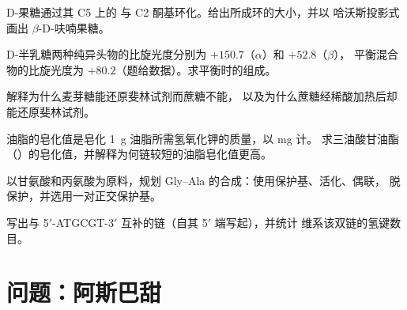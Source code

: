 \begin{exercise}[$\star\star$]\label{exo:b2:biomolecules:7}
D-果糖通过其 C5 上的  与 C2 酮基环化。给出所成环的大小，并以
哈沃斯投影式画出 $\beta$-D-呋喃果糖。
\end{exercise}

\begin{exercise}[$\star\star$]\label{exo:b2:biomolecules:8}
D-半乳糖两种纯异头物的比旋光度分别为 $+150.7$（$\alpha$）和 $+52.8$（$\beta$），
平衡混合物的比旋光度为 $+80.2$（题给数据）。求平衡时的组成。
\end{exercise}

\begin{exercise}[$\star\star$]\label{exo:b2:biomolecules:9}
解释为什么麦芽糖能还原斐林试剂而蔗糖不能，
以及为什么蔗糖经稀酸加热后却能还原斐林试剂。
\end{exercise}

\begin{exercise}[$\star\star\star$]\label{exo:b2:biomolecules:10}
油脂的皂化值是皂化 1~g 油脂所需氢氧化钾的质量，以 mg 计。
求三油酸甘油酯（）的皂化值，并解释为何链较短的油脂皂化值更高。
\end{exercise}

\begin{exercise}[$\star\star\star$]\label{exo:b2:biomolecules:11}
以甘氨酸和丙氨酸为原料，规划 Gly--Ala 的合成：使用保护基、活化、偶联，
脱保护，并选用一对正交保护基。
\end{exercise}

\begin{exercise}[$\star\star\star$]\label{exo:b2:biomolecules:12}
写出与 5$'$-ATGCGT-3$'$ 互补的链（自其 5$'$ 端写起），并统计
维系该双链的氢键数目。
\end{exercise}

\section{问题：阿斯巴甜}

